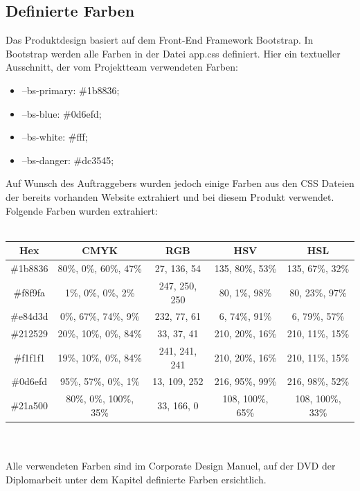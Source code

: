 \subsection{Definierte Farben}
Das Produktdesign basiert auf dem Front-End Framework Bootstrap. In Bootstrap werden alle Farben in der Datei \glqq app.css \grqq \space definiert. Hier ein textueller Ausschnitt, der vom Projektteam verwendeten Farben:
\\
\begin{itemize}
	\item --bs-primary: \#1b8836;
	\item --bs-blue: \#0d6efd;
	\item --bs-white: \#fff;
	\item --bs-danger: \#dc3545;
\end{itemize}
\newpage
Auf Wunsch des Auftraggebers wurden jedoch einige Farben aus den CSS Dateien der bereits vorhanden Website extrahiert und bei diesem Produkt verwendet. Folgende Farben wurden extrahiert:
\\
\\
\begin{tabular}{|c|c|c|c|c|}
	\hline
	Hex & CMYK & RGB & HSV & HSL \\
	\hline
	\#1b8836 & 80\%, 0\%, 60\%, 47\% & 27, 136, 54 & 135, 80\%, 53\% & 135, 67\%, 32\%  \\
	\hline 
	\#f8f9fa & 1\%, 0\%, 0\%, 2\% & 247, 250, 250 & 80, 1\%, 98\% & 80, 23\%, 97\% \\
	\hline
	\#e84d3d & 0\%, 67\%, 74\%, 9\% & 232, 77, 61 & 6, 74\%, 91\% & 6, 79\%, 57\% \\
	\hline
	\#212529 & 20\%, 10\%, 0\%, 84\% & 33, 37, 41 & 210, 20\%, 16\% & 210, 11\%, 15\% \\
	\hline
	\#f1f1f1 & 19\%, 10\%, 0\%, 84\% & 241, 241, 241 & 210, 20\%, 16\% & 210, 11\%, 15\% \\
	\hline
	\#0d6efd & 95\%, 57\%, 0\%, 1\% & 13, 109, 252 & 216, 95\%, 99\% & 216, 98\%, 52\% \\
	\hline
	\#21a500 & 80\%, 0\%, 100\%, 35\% & 33, 166, 0 & 108, 100\%, 65\% & 108, 100\%, 33\% \\
	\hline
	

\end{tabular}
	\\
\\
Alle verwendeten Farben sind im Corporate Design Manuel, auf der DVD der Diplomarbeit unter dem Kapitel  definierte Farben ersichtlich.


